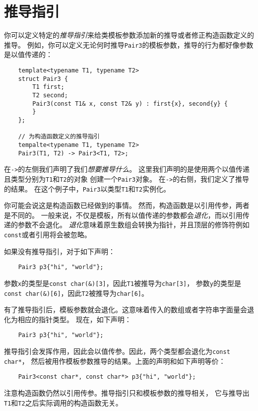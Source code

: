 \section{推导指引}\label{ch9.2}
你可以定义特定的\emph{推导指引}来给类模板参数添加新的推导或者修正构造函数定义的推导。
例如，你可以定义无论何时推导\texttt{Pair3}的模板参数，推导的行为都好像参数是以值传递的：
\begin{lstlisting}
    template<typename T1, typename T2>
    struct Pair3 {
        T1 first;
        T2 second;
        Pair3(const T1& x, const T2& y) : first{x}, second{y} {
        }
    };

    // 为构造函数定义的推导指引
    tempalte<typename T1, typename T2>
    Pair3(T1, T2) -> Pair3<T1, T2>;
\end{lstlisting}
在\texttt{->}的左侧我们声明了我们\emph{想要推导什么}。
这里我们声明的是使用两个以值传递且类型分别为\texttt{T1}和\texttt{T2}的对象
创建一个\texttt{Pair3}对象。
在\texttt{->}的右侧，我们定义了推导的结果。
在这个例子中，\texttt{Pair3}以类型\texttt{T1}和\texttt{T2}实例化。

你可能会说这是构造函数已经做到的事情。
然而，构造函数是以引用传参，两者是不同的。
一般来说，不仅是模板，所有以值传递的参数都会\emph{退化}，而以引用传递的参数不会退化。
\emph{退化}意味着原生数组会转换为指针，并且顶层的修饰符例如\texttt{const}或者引用将会被忽略。

如果没有推导指引，对于如下声明：
\begin{lstlisting}
    Pair3 p3{"hi", "world"};
\end{lstlisting}
参数\texttt{x}的类型是\texttt{const char(\&)[3]}，因此\texttt{T1}被推导为\texttt{char[3]}，
参数\texttt{y}的类型是\texttt{const char(\&)[6]}，因此\texttt{T2}被推导为\texttt{char[6]}。

有了推导指引后，模板参数就会退化。这意味着传入的数组或者字符串字面量会退化为相应的指针类型。
现在，如下声明：
\begin{lstlisting}
    Pair3 p3{"hi", "world"};
\end{lstlisting}
推导指引会发挥作用，因此会以值传参。因此，两个类型都会退化为\texttt{const char*}，
然后被用作模板参数推导的结果。上面的声明和如下声明等价：
\begin{lstlisting}
    Pair3<const char*, const char*> p3{"hi", "world"};
\end{lstlisting}
注意构造函数仍然以引用传参。推导指引只和模板参数的推导相关，
它与推导出\texttt{T1}和\texttt{T2}之后实际调用的构造函数无关。

